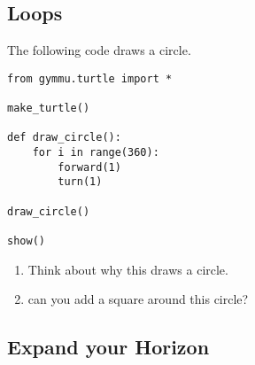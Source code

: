\documentclass[11pt,a4paper]{report}
\begin{document}
\newpage

\subsection{Loops}

\begin{ex}
The following code draws a circle.
\begin{lstlisting}
from gymmu.turtle import *

make_turtle()

def draw_circle():
    for i in range(360):
        forward(1)
        turn(1)

draw_circle()
    
show()
\end{lstlisting}

\begin{enumerate}
\item Think about why this draws a circle.
\item can you add a square around this circle?
\end{enumerate}
\end{ex}

\subsection{Expand your Horizon}
\end{document}
